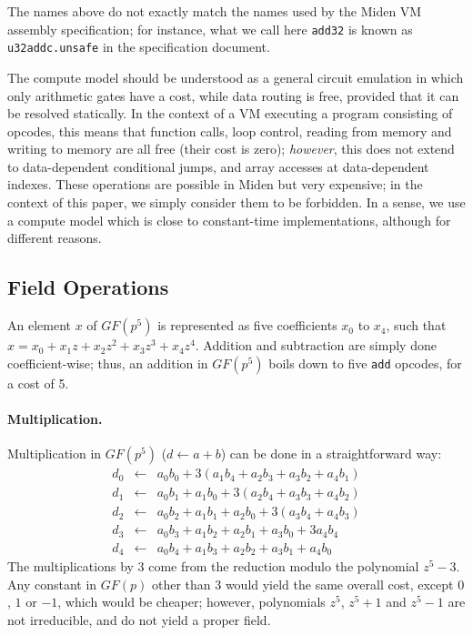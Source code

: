 \documentclass{llncs}
\newcommand{\GF}{GF}
\begin{document}
The names above do not exactly match the names used by the Miden VM
assembly spe\-cification\cite{MidenAsm}; for instance, what we call here
\verb+add32+ is known as \verb+u32addc.unsafe+ in the specification
document.

The compute model should be understood as a general circuit emulation in
which only arithmetic gates have a cost, while data routing is free,
provided that it can be resolved statically. In the context of a VM
executing a program consisting of opcodes, this means that function
calls, loop control, reading from memory and writing to memory are all
free (their cost is zero); \emph{however}, this does not extend to
data-dependent conditional jumps, and array accesses at data-dependent
indexes. These operations are possible in Miden but very expensive; in
the context of this paper, we simply consider them to be forbidden. In a
sense, we use a compute model which is close to constant-time
implementations, although for different reasons.

\subsection{Field Operations}\label{sec:invm-field}

An element $x$ of $\GF(p^5)$ is represented as five coefficients $x_0$
to $x_4$, such that $x = x_0 + x_1 z + x_2 z^2 + x_3 z^3 + x_4 z^4$.
Addition and subtraction are simply done coefficient-wise; thus, an
addition in $\GF(p^5)$ boils down to five \verb+add+ opcodes, for a cost
of 5.

\paragraph{Multiplication.} Multiplication in $\GF(p^5)$ ($d\leftarrow a
+ b$) can be done in a straightforward way:
\begin{eqnarray*}
    d_0 &\leftarrow& a_0 b_0 + 3 (a_1 b_4 + a_2 b_3 + a_3 b_2 + a_4 b_1) \\
    d_1 &\leftarrow& a_0 b_1 + a_1 b_0 + 3 (a_2 b_4 + a_3 b_3 + a_4 b_2) \\
    d_2 &\leftarrow& a_0 b_2 + a_1 b_1 + a_2 b_0 + 3 (a_3 b_4 + a_4 b_3) \\
    d_3 &\leftarrow& a_0 b_3 + a_1 b_2 + a_2 b_1 + a_3 b_0 + 3 a_4 b_4 \\
    d_4 &\leftarrow& a_0 b_4 + a_1 b_3 + a_2 b_2 + a_3 b_1 + a_4 b_0
\end{eqnarray*}
The multiplications by 3 come from the reduction modulo the polynomial
$z^5 - 3$. Any constant in $\GF(p)$ other than 3 would yield the same
overall cost, except $0$, $1$ or $-1$, which would be cheaper; however,
polynomials $z^5$, $z^5+1$ and $z^5-1$ are not irreducible, and do not
yield a proper field.
\end{document}
